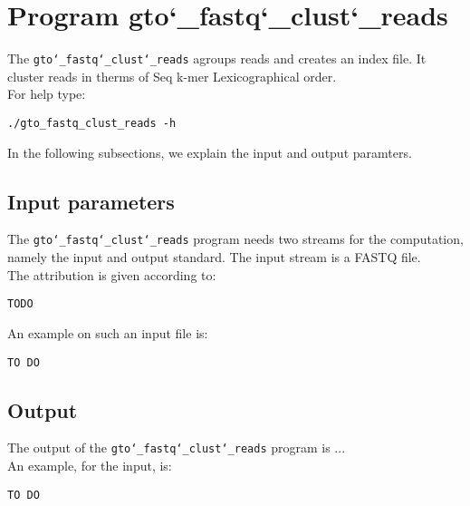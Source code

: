 \section{Program gto\char`_fastq\char`_clust\char`_reads}
The \texttt{gto\char`_fastq\char`_clust\char`_reads} agroups reads and creates an index file. It cluster reads in therms of Seq k-mer Lexicographical order.\\
For help type:
\begin{lstlisting}
./gto_fastq_clust_reads -h
\end{lstlisting}
In the following subsections, we explain the input and output paramters.

\subsection*{Input parameters}

The \texttt{gto\char`_fastq\char`_clust\char`_reads} program needs two streams for the computation,
namely the input and output standard. The input stream is a FASTQ file.\\
The attribution is given according to:
\begin{lstlisting}
TODO
\end{lstlisting}
An example on such an input file is:
\begin{lstlisting}
TO DO
\end{lstlisting}

\subsection*{Output}
The output of the \texttt{gto\char`_fastq\char`_clust\char`_reads} program is ...\\
An example, for the input, is:
\begin{lstlisting}
TO DO
\end{lstlisting}